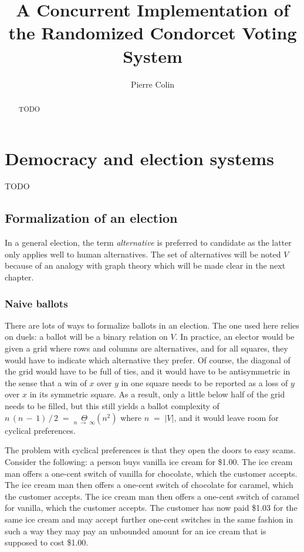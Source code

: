 \documentclass{report}
\title{A Concurrent Implementation of the Randomized Condorcet Voting System}
\author{Pierre Colin}
\date{}
\theoremstyle{definition}
\theoremstyle{plain}
\begin{document}
\maketitle

\begin{abstract}
TODO
\end{abstract}

\chapter{Democracy and election systems}
TODO

\section{Formalization of an election}
In a general election, the term \emph{alternative} is preferred to candidate as
the latter only applies well to human alternatives. The set of alternatives
will be noted $V$ because of an analogy with graph theory which will be made
clear in the next chapter.

\subsection{Naive ballots}
There are lots of ways to formalize ballots in an election. The one used here
relies on duels: a ballot will be a binary relation on $V$. In practice, an
elector would be given a grid where rows and columns are alternatives, and for
all squares, they would have to indicate which alternative they prefer. Of
course, the diagonal of the grid would have to be full of ties, and it would
have to be antisymmetric in the sense that a win of $x$ over $y$ in one square
needs to be reported as a loss of $y$ over $x$ in its symmetric square. As a
result, only a little below half of the grid needs to be filled, but this still
yields a ballot complexity of
$n\,\left(n\,-\,1\right) \,/\, 2\;
	=\; \underset{n\;\to\;\infty}\Theta\left(n^2\right)$
where $n\;=\;\left|V\right|$, and it would leave room for cyclical preferences.

The problem with cyclical preferences is that they open the doors to easy
scams. Consider the following: a person buys vanilla ice cream for \$1.00. The
ice cream man offers a one-cent switch of vanilla for chocolate, which the
customer accepts. The ice cream man then offers a one-cent switch of chocolate
for caramel, which the customer accepts. The ice cream man then offers a
one-cent switch of caramel for vanilla, which the customer accepts. The
customer has now paid \$1.03 for the same ice cream and may accept further
one-cent switches in the same fashion in such a way they may pay an unbounded
amount for an ice cream that is supposed to cost \$1.00.
\end{document}

